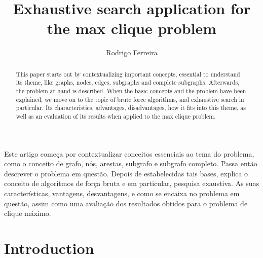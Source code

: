 \documentclass[...]{revdetua}
\begin{document}

\title{Exhaustive search application for the max clique problem}
\author{Rodrigo Ferreira} %
\maketitle

\begin{resumo}%
	Este artigo começa por contextualizar conceitos essenciais ao tema do problema, como o conceito de grafo, nós, arestas, subgrafo e subgrafo completo. Passa então descrever o problema em questão. Depois de estabelecidas tais bases, explica o conceito de algoritmos de força bruta e em particular, pesquisa exaustiva. As suas características, vantagens, desvantagens, e como se encaixa no problema em questão, assim como uma avaliação dos resultados obtidos para o problema de clique máximo.
\end{resumo}

\begin{abstract}%
  This paper starts out by contextualizing important concepts, essential to understand its theme, like graphs, nodes, edges, subgraphs and complete subgraphs. Afterwards, the problem at hand is described. When the basic concepts and the problem have been explained, we move on to the topic of brute force algorithms, and exhaustive search in particular. Its characteristics, advantages, disadvantages, how it fits into this theme, as well as an evaluation of its results when applied to the max clique problem.
\end{abstract}
\section{Introduction}
\end{document}
